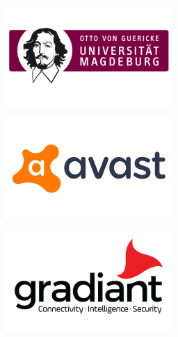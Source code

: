 \documentclass{beamer}
\begin{document}
\begin{frame}
{{\begin{minipage}{.15\textwidth}\includegraphics[width=\columnwidth]{../img/logo_ovgu.png}\end{minipage}%
\begin{minipage}{.15\textwidth}\includegraphics[width=\columnwidth]{../img/logo_avast.png}\end{minipage}%
\begin{minipage}{.15\textwidth}\includegraphics[width=\columnwidth]{../img/logo_gradiant.png}\end{minipage}%
}}
\end{frame}
\end{document}
